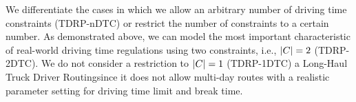\begin{namedproblem}
\end{namedproblem}

We differentiate the cases in which we allow an arbitrary number of driving time constraints (TDRP-nDTC) or restrict the number of constraints to a certain number. As demonstrated above, we can model the most important characteristic of real-world driving time regulations using two constraints, i.e., $|C| = 2$ (TDRP-2DTC). We do not consider a restriction to $|C| = 1$ (TDRP-1DTC) a Long-Haul Truck Driver Routingsince it does not allow multi-day routes with a realistic parameter setting for driving time limit and break time.